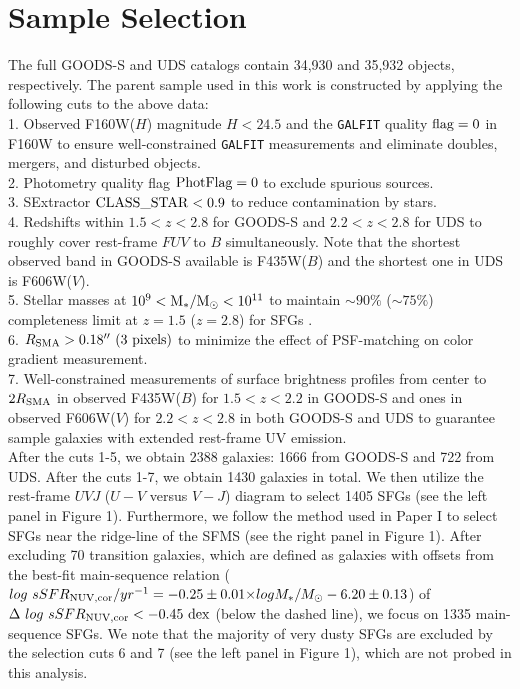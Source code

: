 \documentclass[twocolumn]{aastex61}
\begin{document}
\section{Sample Selection}

The full GOODS-S and UDS catalogs contain 34,930 and 35,932 objects, respectively. 
The parent sample used in this work is constructed 
by applying the following cuts to the above data: \\

1. Observed F160W($H$) magnitude $ H < 24.5$ and the {\tt GALFIT} quality $\rm flag = 0$ in F160W 
\citep[][]{vdWel+12} to ensure well-constrained {\tt GALFIT} measurements 
and eliminate doubles, mergers, and disturbed objects. \\

2. Photometry quality flag $\rm PhotFlag = 0$ to exclude spurious sources. \\

3. SExtractor $\rm CLASS\_STAR < 0.9$ to reduce contamination by stars. \\

4. Redshifts within $1.5<z<2.8$ for GOODS-S and $2.2<z<2.8$ for UDS to roughly cover 
rest-frame $FUV$ to $B$ simultaneously. Note that the shortest observed band in GOODS-S available 
is F435W($B$) and the shortest one in UDS is F606W($V$). \\ 

5. Stellar masses at $\rm 10^{9} < M_{\ast}/M_{\odot} < 10^{11}$ to maintain 
$\sim90\%$ ($\sim75\%$) completeness limit at $z=1.5$ ($z=2.8$) 
for SFGs \citep[][]{vdWel2014,Morishita15}. \\

6. $R_{\rm SMA}>0.18^{\prime\prime}~(\rm 3~pixels)$ to minimize the effect of
PSF-matching on color gradient measurement. \\

7. Well-constrained measurements of surface brightness profiles 
from center to $2R_{\rm SMA}$ in observed F435W($B$) for $1.5<z<2.2$ in GOODS-S and 
ones in observed F606W($V$) for $2.2<z<2.8$ in both GOODS-S and UDS to 
guarantee sample galaxies with extended rest-frame UV emission.\\   

After the cuts 1-5, we obtain 2388 galaxies: 
1666 from GOODS-S and 722 from UDS. After the cuts 1-7, we 
obtain 1430 galaxies in total. 
We then utilize the rest-frame $UVJ$ ($U-V$ versus $V-J$) diagram 
\citep[$(U - V) < 0.88 \times (V - J) + 0.49$,][]{Williams09} 
to select 1405 SFGs (see the left panel in Figure 1). 
%
Furthermore, we follow the method used in Paper I to select SFGs 
near the ridge-line of the SFMS (see the right panel in Figure 1). 
After excluding 70 transition galaxies, which are defined as 
galaxies with offsets from the best-fit main-sequence relation 
($log~sSFR_{\rm NUV,cor}/yr^{-1}=-0.25\pm0.01 {\times} logM_{\ast}/M_{\odot}-6.20\pm0.13$) 
of ${\rm \Delta}~log~sSFR_{\rm NUV,cor}<{\rm -0.45~dex}$ (below the dashed line), we 
focus on 1335 main-sequence SFGs.
We note that the majority of very dusty SFGs are excluded 
by the selection cuts 6 and 7 (see the left panel in Figure 1), 
which are not probed in this analysis.
\end{document}
